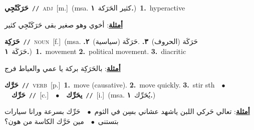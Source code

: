 \documentclass[10pt,a4paper,twoside]{article} %
\begin{document}
\begin{multicols}{2}
{\setlength\topsep{0pt}\textbf{\foreignlanguage{arabic}{حَرَكَنْجِي}}\ {\color{gray}\texttt{//}\color{black}}\ \textsc{adj}\ [m.]\ \color{gray}(msa. \foreignlanguage{arabic}{كثير الحَرَكة}~\foreignlanguage{arabic}{\textbf{١.}})\color{black}\ \textbf{1.}~hyperactive\  \begin{flushright}\color{gray}\foreignlanguage{arabic}{\textbf{\underline{\foreignlanguage{arabic}{أمثلة}}}: أخوي وهو صغير بقى حَرَكَنْجِي كثير}\end{flushright}\color{black}} \vspace{2mm}

{\setlength\topsep{0pt}\textbf{\foreignlanguage{arabic}{حَرَكِة}}\ {\color{gray}\texttt{//}\color{black}}\ \textsc{noun}\ [f.]\ \color{gray}(msa. \foreignlanguage{arabic}{حَرَكَة (الحروف)}~\foreignlanguage{arabic}{\textbf{٣.}}  .\foreignlanguage{arabic}{حَرَكَة (سياسية)}~\foreignlanguage{arabic}{\textbf{٢.}}  \foreignlanguage{arabic}{حَرَكَة}~\foreignlanguage{arabic}{\textbf{١.}})\color{black}\ \textbf{1.}~movement  \textbf{2.}~political movement.  \textbf{3.}~diacritic\  \begin{flushright}\color{gray}\foreignlanguage{arabic}{\textbf{\underline{\foreignlanguage{arabic}{أمثلة}}}: بالحَرَكِة بركة يا عمي والعياط فرج}\end{flushright}\color{black}} \vspace{2mm}

{\setlength\topsep{0pt}\textbf{\foreignlanguage{arabic}{حَرَّك}}\ {\color{gray}\texttt{//}\color{black}}\ \textsc{verb}\ [p.]\ \textbf{1.}~move (causative).  \textbf{2.}~move quickly.  \textbf{3.}~stir sth\ \ $\bullet$\ \ \setlength\topsep{0pt}\textbf{\foreignlanguage{arabic}{حَرِّك}}\ {\color{gray}\texttt{//}\color{black}}\ [c.]\ \ $\bullet$\ \ \setlength\topsep{0pt}\textbf{\foreignlanguage{arabic}{يحَرِّك}}\ {\color{gray}\texttt{//}\color{black}}\ [i.]\ \color{gray}(msa. \foreignlanguage{arabic}{يُحَرِّك}~\foreignlanguage{arabic}{\textbf{١.}})\color{black}\  \begin{flushright}\color{gray}\foreignlanguage{arabic}{\textbf{\underline{\foreignlanguage{arabic}{أمثلة}}}: تعالي حَركي اللبن ياشهد عشاني بسِن في الثوم\ $\bullet$\ \  حَرِّك بسرعة ورانا سيارات بتستنى\ $\bullet$\ \  مين حَرَّك الكاسة من هون؟}\end{flushright}\color{black}} \vspace{2mm}


\end{multicols}
\end{document}
